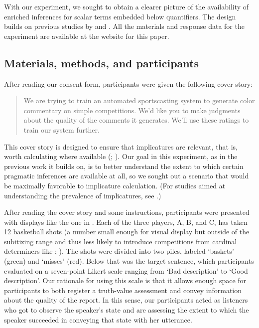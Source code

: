 \documentclass[leqno]{article}
\begin{document}
With our experiment, we sought to obtain a clearer picture of the
availability of enriched inferences for scalar terms embedded below
quantifiers. The design builds on previous studies by
\citet{Geurts:Pouscoulous:2009} and \citet{Chemla:Spector:2011}. All
the materials and response data for the experiment are available at
the website for this paper.


\subsection{Materials, methods, and participants}

After reading our consent form, participants were given the following
cover story:

\begin{quote}
  We are trying to train an automated sportscasting system to generate
  color commentary on simple competitions. We'd like you to make
  judgments about the quality of the comments it generates. We'll use
  these ratings to train our system further.
\end{quote}

This cover story is designed to ensure that implicatures are relevant,
that is, worth calculating where available
(;
\citealt{Clifton:Dube:2010}). Our goal in this experiment, as in the
previous work it builds on, is to better understand the extent to
which certain pragmatic inferences are available at all, so we sought
out a scenario that would be maximally favorable to implicature
calculation. (For studies aimed at understanding the prevalence of
implicatures, see \citealt{Paris:1973,Hendriks-etal:2009}.)

After reading the cover story and some instructions, participants were
presented with displays like the one in . Each of the
three players, A, B, and C, has taken 12 basketball shots (a number
small enough for visual display but outside of the subitizing range
and thus less likely to introduce competitions from cardinal
determiners like ;
\citealt{Degen:Tanenhaus:2014}). The shots were divided into two
piles, labeled `baskets' (green) and `misses' (red). Below that was
the target sentence, which participants evaluated on a seven-point
Likert scale ranging from `Bad description' to `Good description'. Our
rationale for using this scale is that it allows enough space for
participants to both register a truth-value assessment and convey
information about the quality of the report. In this sense, our
participants acted as listeners who got to observe the speaker's state
and are assessing the extent to which the speaker succeeded in
conveying that state with her utterance.
\end{document}
